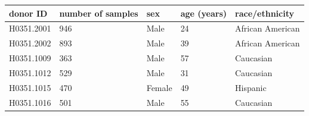 \begin{refsection}
\begin{table}[H]
\small
{}\selectfont
{} \label{table3S10} 
\centering
\begin{tabular}{@{}lllll@{}}
\hline
donor ID   & number of samples & sex    & age (years) & race/ethnicity   \\ \hline
H0351.2001 & 946               & Male   & 24          & African American \\
H0351.2002 & 893               & Male   & 39          & African American \\
H0351.1009 & 363               & Male   & 57          & Caucasian        \\
H0351.1012 & 529               & Male   & 31          & Caucasian        \\
H0351.1015 & 470               & Female & 49          & Hispanic         \\
H0351.1016 & 501               & Male   & 55          & Caucasian        \\ \hline
\end{tabular}
\end{table}



\end{refsection}
